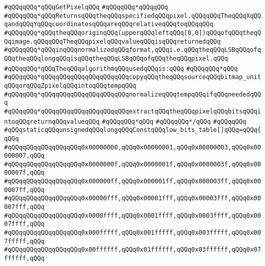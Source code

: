 \verb|#qQQqqQQq*qQQqGetPixelqQQq|\newline
\verb|#qQQqqQQq*qQQqqQQq|\newline
\verb|#qQQqqQQq*qQQqReturnsqQQqtheqQQqspecifiedqQQqpixel.qQQqqQQqTheqQQqXqQQqandqQQqYqQQqcoordinatesqQQqareqQQqrelativeqQQqtoqQQqqQQq|\newline
\verb|#qQQqqQQq*qQQqtheqQQqoriginqQQq(upperqQQqleftqQQq[0,0])qQQqofqQQqtheqQQqimage.qQQqqQQqTheqQQqpixelqQQqvalueqQQqisqQQqreturnedqQQq|\newline
\verb|#qQQqqQQq*qQQqinqQQqnormalizedqQQqformat,qQQqi.e.qQQqtheqQQqLSBqQQqofqQQqtheqQQqlongqQQqisqQQqtheqQQqLSBqQQqofqQQqtheqQQqpixel.qQQq|\newline
\verb|#qQQqqQQq*qQQqTheqQQqalgorithmqQQqusedqQQqis:qQQq|\newline
\verb|#qQQqqQQq*qQQq|\newline
\verb|#qQQqqQQq*qQQqqQQqqQQqqQQqqQQqqQQqcopyqQQqtheqQQqsourceqQQqbitmap_unitqQQqorqQQqZpixelqQQqintoqQQqtempqQQq|\newline
\verb|#qQQqqQQq*qQQqqQQqqQQqqQQqqQQqqQQqnormalizeqQQqtempqQQqifqQQqneededqQQq|\newline
\verb|#qQQqqQQq*qQQqqQQqqQQqqQQqqQQqqQQqextractqQQqtheqQQqpixelqQQqbitsqQQqintoqQQqreturnqQQqvalueqQQq|\newline
\verb|#qQQqqQQq*qQQq|\newline
\verb|#qQQqqQQq*/qQQq|\newline
\verb|#qQQqqQQq|\newline
\verb|#qQQqstaticqQQqunsignedqQQqlongqQQqConstqQQqlow_bits_table[]qQQq=qQQq{qQQq|\newline
\verb|#qQQqqQQqqQQqqQQqqQQq0x00000000,qQQq0x00000001,qQQq0x00000003,qQQq0x00000007,qQQq|\newline
\verb|#qQQqqQQqqQQqqQQqqQQq0x0000000f,qQQq0x0000001f,qQQq0x0000003f,qQQq0x0000007f,qQQq|\newline
\verb|#qQQqqQQqqQQqqQQqqQQq0x000000ff,qQQq0x000001ff,qQQq0x000003ff,qQQq0x000007ff,qQQq|\newline
\verb|#qQQqqQQqqQQqqQQqqQQq0x00000fff,qQQq0x00001fff,qQQq0x00003fff,qQQq0x00007fff,qQQq|\newline
\verb|#qQQqqQQqqQQqqQQqqQQq0x0000ffff,qQQq0x0001ffff,qQQq0x0003ffff,qQQq0x0007ffff,qQQq|\newline
\verb|#qQQqqQQqqQQqqQQqqQQq0x000fffff,qQQq0x001fffff,qQQq0x003fffff,qQQq0x007fffff,qQQq|\newline
\verb|#qQQqqQQqqQQqqQQqqQQq0x00ffffff,qQQq0x01ffffff,qQQq0x03ffffff,qQQq0x07ffffff,qQQq|\newline
